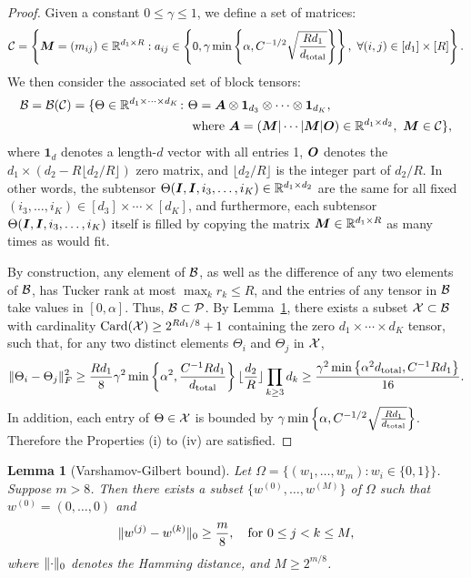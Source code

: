 \documentclass[11pt]{article}
\theoremstyle{plain}
\newtheorem{lem}{Lemma}
\theoremstyle{definition}
\begin{document}
\begin{proof}
Given a constant $0\leq \gamma \leq 1$, we define a set of matrices:
\[
\mathcal{C}=\left\{\bm M=(m_{ij})\in\mathbb{R}^{d_1\times R}: a_{ij}\in \left\{ 0,\gamma \min\left\{ \alpha , C^{-1/2}\sqrt{Rd_1\over d_{\text{total}}} \right\}\right\} ,\  \forall (i,j)\in[d_1]\times[R]\right\}.
\]
We then consider the associated set of block tensors:
\begin{align}
\mathcal{B}=\mathcal{B}(\mathcal{C})=\{\Theta\in\mathbb{R}^{d_1\times \cdots \times d_K}\colon& \Theta=\bm A\otimes \mathbf{1}_{d_3}\otimes \cdots \otimes \mathbf{1}_{d_K}, \\
&\ \text{where}\ \bm A=(\bm M|\cdots|\bm M|\bm{O}) \in\mathbb{R}^{d_1\times d_2},\ \bm M\in\mathcal{C}\},
\end{align}
where $\mathbf{1}_d$ denotes a length-$d$ vector with all entries 1, $\bm{O}$ denotes the $d_1\times (d_2-R\lfloor d_2/R \rfloor)$ zero matrix, and $\lfloor d_2/ R \rfloor$ is the integer part of $d_2/R$. In other words, the subtensor $\Theta(\bm I, \bm I,i_3, \ldots,i_K)\in\mathbb{R}^{d_1\times d_2}$ are the same for all fixed $(i_3,\ldots,i_K)\in[d_3]\times \cdots \times [d_K]$, and furthermore, each subtensor $\Theta(\bm I,\bm I, i_3,\ldots,i_K)$ itself is filled by copying the matrix $\bm M\in\mathbb{R}^{d_1\times R}$ as many times as would fit.

By construction, any element of $\mathcal{B}$, as well as the difference of any two elements of $\mathcal{B}$, has Tucker rank at most $\max_k r_k\leq R$, and the entries of any tensor in $\mathcal{B}$ take values in $[0,\alpha]$. Thus, $\mathcal{B}\subset\mathcal{P}$. By Lemma~\ref{lem:VGbound}, there exists a subset $\mathcal{X}\subset \mathcal{B}$ with cardinality $\text{Card}(\mathcal{X})\geq 2^{Rd_1/8}+1$ containing the zero $d_1\times \cdots \times d_K$ tensor, such that, for any two distinct elements $\Theta_i$ and $\Theta_j$ in $\mathcal{X}$,
\[
\lVert\Theta_i-\Theta_j\rVert_F^2 \geq {Rd_1\over 8} \gamma^2\min\left\{ \alpha^2, {C^{-1}Rd_1 \over d_{\text{total}}}\right\} \lfloor {d_2\over R} \rfloor \prod_{k\geq 3}d_k\geq {\gamma^2\min\left\{ \alpha^2 d_{\text{total}}, C^{-1}Rd_1\right\}  \over 16}.
\]
In addition, each entry of $\Theta\in\mathcal{X}$ is bounded by $\gamma \min\left\{ \alpha , C^{-1/2}\sqrt{Rd_1\over d_{\text{total}}}\right\} $. Therefore the Properties (i) to (iv) are satisfied.
\end{proof}



\begin{lem}[Varshamov-Gilbert bound]\label{lem:VGbound}
Let $\Omega=\{(w_1,\ldots,w_m)\colon w_i\in\{0,1\}\}$. Suppose $m>8$. Then there exists a subset $\{w^{(0)},\ldots,w^{(M)}\}$ of $\Omega$ such that $w^{(0)}=(0,\ldots,0)$ and
\[
\lVert w^{(j)}-w^{(k)}\rVert_0\geq {m\over 8},\quad \text{for} \ 0\leq j<k\leq M,
\]
where $\lVert\cdot\rVert_0$ denotes the Hamming distance, and $M\geq 2^{m/8}$.
\end{lem}
\end{document}
